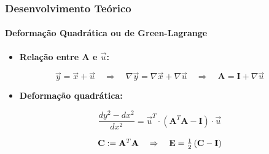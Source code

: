 \documentclass{beamer}
\begin{document}
\begin{frame}
    \frametitle{Desenvolvimento Teórico}
        \framesubtitle{Deformação Quadrática ou de Green-Lagrange}

        \begin{itemize}
            \item \textbf{Relação entre \(\mathbf{A}\) e \(\vec{u}\):}
        \end{itemize}

        \begin{equation}
            \vec{y} = \vec{x} + \vec{u} \quad \Rightarrow \quad \nabla \vec{y} = \nabla \vec{x} + \nabla \vec{u} \quad \Rightarrow \quad \mathbf{A} = \mathbf{I} + \nabla \vec{u}
        \end{equation}

        \begin{itemize}
            \item \textbf{Deformação quadrática:}
        \end{itemize}

        \begin{equation}
            \frac{dy^2 - dx^2}{dx^2} =  \vec{u}^T \cdot \left(\mathbf{A} ^T \mathbf{A}  - \mathbf{I}  \right) \cdot \vec{u} 
        \end{equation}

        \begin{equation}
            \scalebox{1.0}{$
            \mathbf{C}  := \mathbf{A} ^T \mathbf{A}  \quad \Rightarrow \quad \mathbf{E} = \frac{1}{2} \left(\mathbf{C}  - \mathbf{I} \right)
            $}
        \end{equation}
\end{frame}
\end{document}
